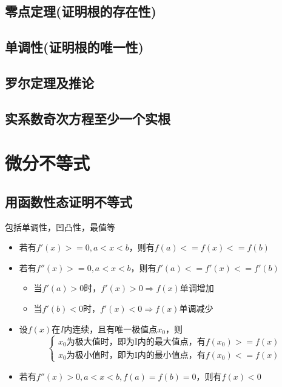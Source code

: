 \subsection{零点定理(证明根的存在性)}

\subsection{单调性(证明根的唯一性)}

\subsection{罗尔定理及推论}

\subsection{实系数奇次方程至少一个实根}


\section{微分不等式}

\subsection{用函数性态证明不等式}
包括单调性，凹凸性，最值等\begin{itemize}
    \item 若有\(f'(x) >= 0, a < x < b\)，则有\(f(a) <= f(x) <= f(b)\)
    \item 若有\(f''(x) >= 0, a < x < b\)，则有\(f'(a) <= f'(x) <= f'(b)\)\begin{itemize}
        \item 当\(f'(a) > 0\)时，\(f'(x) > 0 \Rightarrow f(x)\)单调增加
        \item 当\(f'(b) < 0\)时，\(f'(x) < 0 \Rightarrow f(x)\)单调减少
    \end{itemize}
    \item 设\(f(x)\)在\(I\)内连续，且有唯一极值点\(x_0\)，则\[\begin{cases}
        x_0\text{为极大值时，即为I内的最大值点，有}f(x_0) >= f(x) \\ 
        x_0\text{为极小值时，即为I内的最小值点，有}f(x_0) <= f(x)
    \end{cases}\]
    \item 若有\(f''(x) > 0, a < x < b, f(a) = f(b) = 0\)，则有\(f(x) < 0\)
\end{itemize}


